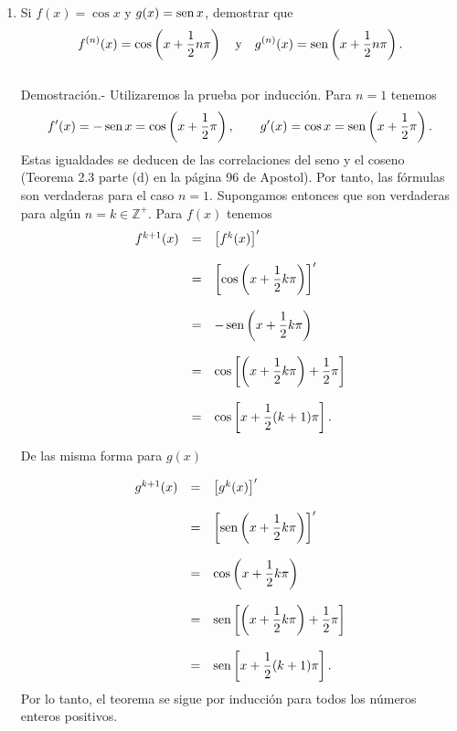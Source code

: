 \begin{enumerate}[\bfseries 1.]
    \item Si $f(x)=\cos x$ y $g(x)=\mathop{\mbox{\normalfont sen}}\nolimits x$, demostrar que
    $$f^{(n)}(x)=\cos\left(x+\dfrac{1}{2}n\pi\right)\quad \mbox{y}\quad g^{(n)}(x)=\mathop{\mbox{\normalfont sen}}\nolimits\left(x+\dfrac{1}{2}n\pi\right).$$\\
	Demostración.-\; Utilizaremos la prueba por inducción. Para $n=1$ tenemos
	$$f'(x)=-\mathop{\mbox{\normalfont sen}}\nolimits x = \cos \left(x+\dfrac{1}{2}\pi\right),\qquad g'(x)=\cos x = \mathop{\mbox{\normalfont sen}}\nolimits\left(x+\dfrac{1}{2}\pi\right).$$
	Estas igualdades se deducen de las correlaciones del seno y el coseno (Teorema 2.3 parte (d) en la página 96 de Apostol).  Por tanto, las fórmulas son verdaderas para el caso $n=1$. Supongamos entonces que son verdaderas para algún $n=k\in\mathbb{Z}^+$. Para $f(x)$ tenemos
	$$
	\begin{array}{rcl}
	    f^{k+1}(x)&=&\left[f^{k}(x)\right]'\\\\
		      &=&\left[\cos\left(x+\dfrac{1}{2}k\pi\right)\right]'\\\\
		      &=&-\mathop{\mbox{\normalfont sen}}\nolimits\left(x+\dfrac{1}{2}k\pi\right)\\\\
		      &=&\cos\left[\left(x+\dfrac{1}{2} k \pi\right)+\dfrac{1}{2}\pi\right]\\\\
		      &=&\cos\left[x+\dfrac{1}{2}(k+1)\pi\right].
	\end{array}
	$$

	De las misma forma para $g(x)$

	$$
	\begin{array}{rcl}
	    g^{k+1}(x)&=&\left[g^{k}(x)\right]'\\\\
		      &=&\left[\mathop{\mbox{\normalfont sen}}\nolimits\left(x+\dfrac{1}{2}k\pi\right)\right]'\\\\
		      &=&\cos\left(x+\dfrac{1}{2}k\pi\right)\\\\
		      &=&\mathop{\mbox{\normalfont sen}}\nolimits\left[\left(x+\dfrac{1}{2} k \pi\right)+\dfrac{1}{2}\pi\right]\\\\
		      &=&\mathop{\mbox{\normalfont sen}}\nolimits\left[x+\dfrac{1}{2}(k+1)\pi\right].
	\end{array}
	$$
	Por lo tanto, el teorema se sigue por inducción para todos los números enteros positivos.\\\\


\end{enumerate}
